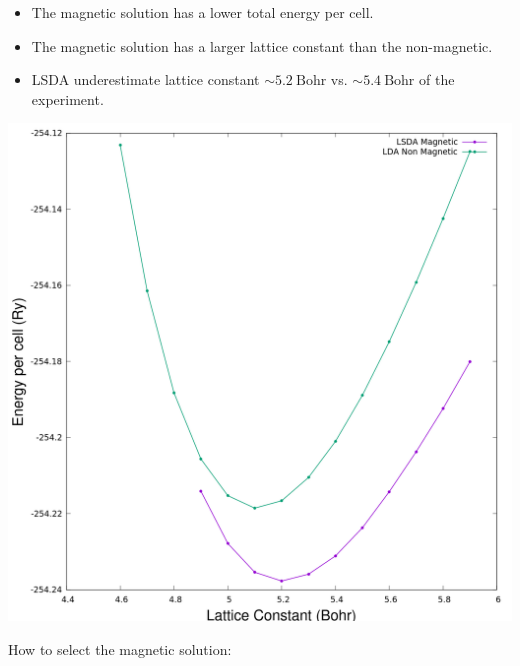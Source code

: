 \documentclass[landscape]{foils}
\begin{document}
\vfill
\parbox{10cm}{
  \begin{itemize}
    \item The magnetic solution has a lower total energy per cell. 
    \item The magnetic solution has a larger lattice constant than the non-magnetic. 
    \item LSDA underestimate lattice constant $\sim 5.2~\mathrm{Bohr}$ vs. $\sim 5.4~\mathrm{Bohr}$ 
    of the experiment.  
  \end{itemize}
}
\hfill \parbox{14cm}{
  \begin{center}
    \includegraphics[width=13.5cm]{figs/alat_lda_mag_vs_mag.png}\\
  \end{center}
}
\vfill

How to select the magnetic solution: 
\end{document}
